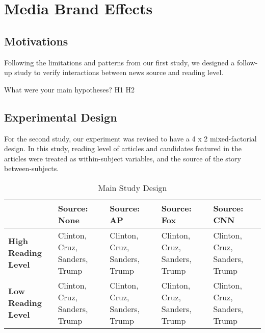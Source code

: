 \chapter{Media Brand Effects}

\section{Motivations}  
Following the limitations and patterns from our first study, we designed a follow-up study to verify interactions between news source and reading level.

What were your main hypotheses?
H1
H2

\section{Experimental Design}

For the second study, our experiment was revised to have a 4 x 2 mixed-factorial design.
In this study, reading level of articles and candidates featured in the articles were treated as within-subject variables, and the source of the story between-subjects.

\begin{center}
\begin{table}
\begin{tabular}{ | m{10em} | m{7em}| m{7em} | m{7em} | m{7em} | } 
 \hline
  & \textbf{Source: None} & \textbf{Source: AP} & \textbf{Source: Fox} & \textbf{Source: CNN} \\
 \hline
 \textbf{High Reading Level} & Clinton, Cruz, Sanders, Trump & Clinton, Cruz, Sanders, Trump & Clinton, Cruz, Sanders, Trump & Clinton, Cruz, Sanders, Trump  \\ 
 \textbf{Low Reading Level} & Clinton, Cruz, Sanders, Trump & Clinton, Cruz, Sanders, Trump & Clinton, Cruz, Sanders, Trump & Clinton, Cruz, Sanders, Trump \\ 
 \hline
\end{tabular}
\caption{Main Study Design}
\label{study2}
\end{table}
\end{center}


